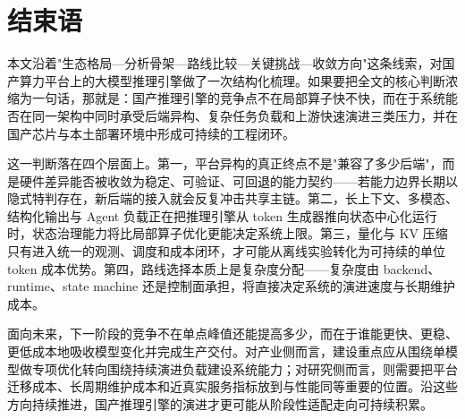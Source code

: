 \section{结束语}

本文沿着"生态格局—分析骨架—路线比较—关键挑战—收敛方向"这条线索，对国产算力平台上的大模型推理引擎做了一次结构化梳理。如果要把全文的核心判断浓缩为一句话，那就是：国产推理引擎的竞争点不在局部算子快不快，而在于系统能否在同一架构中同时承受后端异构、复杂任务负载和上游快速演进三类压力，并在国产芯片与本土部署环境中形成可持续的工程闭环。

这一判断落在四个层面上。第一，平台异构的真正终点不是"兼容了多少后端"，而是硬件差异能否被收敛为稳定、可验证、可回退的能力契约——若能力边界长期以隐式特判存在，新后端的接入就会反复冲击共享主链。第二，长上下文、多模态、结构化输出与 Agent 负载正在把推理引擎从 token 生成器推向状态中心化运行时，状态治理能力将比局部算子优化更能决定系统上限。第三，量化与 KV 压缩只有进入统一的观测、调度和成本闭环，才可能从离线实验转化为可持续的单位 token 成本优势。第四，路线选择本质上是复杂度分配——复杂度由 backend、runtime、state machine 还是控制面承担，将直接决定系统的演进速度与长期维护成本。

面向未来，下一阶段的竞争不在单点峰值还能提高多少，而在于谁能更快、更稳、更低成本地吸收模型变化并完成生产交付。对产业侧而言，建设重点应从围绕单模型做专项优化转向围绕持续演进负载建设系统能力；对研究侧而言，则需要把平台迁移成本、长周期维护成本和近真实服务指标放到与性能同等重要的位置。沿这些方向持续推进，国产推理引擎的演进才更可能从阶段性适配走向可持续积累。
